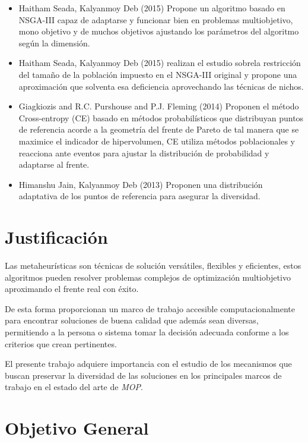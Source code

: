 \documentclass[letterpaper,10pt]{article}
\begin{document}
\begin{itemize}
 \item Haitham Seada, Kalyanmoy Deb (2015) Propone un algoritmo basado en NSGA-III capaz de adaptarse y funcionar bien en problemas multiobjetivo, mono objetivo y de muchos objetivos ajustando los parámetros del algoritmo según la dimensión.\cite{a0ecee762d9f4867a9ded8de598c732e}
 \item Haitham Seada, Kalyanmoy Deb (2015) realizan el estudio sobrela restricción del tamaño de la población impuesto en el NSGA-III original y propone una aproximación que solventa esa deficiencia aprovechando las técnicas de nichos. \cite{7257251}
 \item Giagkiozis and R.C. Purshouse and P.J. Fleming (2014) Proponen el método Cross-entropy (CE) basado en métodos probabilísticos que distribuyan puntos de referencia acorde a la geometría del frente de Pareto de tal manera que se maximice el indicador de hipervolumen, CE utiliza métodos poblacionales y reacciona ante eventos para ajustar la distribución de probabilidad y adaptarse al frente. \cite{Giagkiozis2014363}
 \item Himanshu Jain, Kalyanmoy Deb (2013) Proponen una distribución adaptativa de los puntos de referencia para asegurar la diversidad. \cite{jain2013improved}
\end{itemize}

\section{Justificación}

Las metaheurísticas son técnicas de solución versátiles, flexibles y eficientes, estos algoritmos pueden resolver problemas complejos de optimización multiobjetivo \cite{coello1999comprehensive} aproximando el frente real con éxito.
\newline

De esta forma proporcionan un marco de trabajo accesible computacionalmente para encontrar soluciones de buena calidad que además sean diversas, permitiendo a la persona o sistema tomar la decisión adecuada conforme a los criterios que crean pertinentes.
\newline

El presente trabajo adquiere importancia con el estudio de los mecanismos que buscan preservar la diversidad de las soluciones en los principales marcos de trabajo en el estado del arte de \emph{MOP}.  

\section{Objetivo General}
\end{document}
